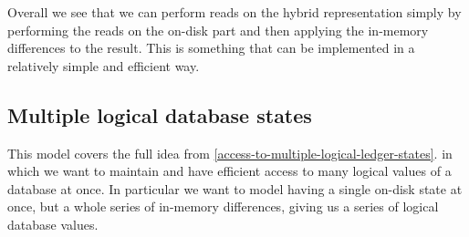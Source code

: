 \documentclass[11pt,a4paper]{article}
\newcommand\restrict[2]{\left.#1\right||_{#2}}
\newcommand\deltavar[1]{\accentset{\Delta}{#1}}
\begin{document}
\begin{center}
\end{center}

Overall we see that we can perform reads on the hybrid representation simply
by performing the reads on the on-disk part and then applying the in-memory
differences to the result. This is something that can be implemented in a
relatively simple and efficient way.

\subsection{Multiple logical database states}
\label{multiple-logical-database-states}

This model covers the full idea from \cref{access-to-multiple-logical-ledger-states}.
in which we want to maintain and have efficient access to many logical values of
a database at once. In particular we want to model having a single on-disk state
at once, but a whole series of in-memory differences, giving us a series of
logical database values.
\end{document}
